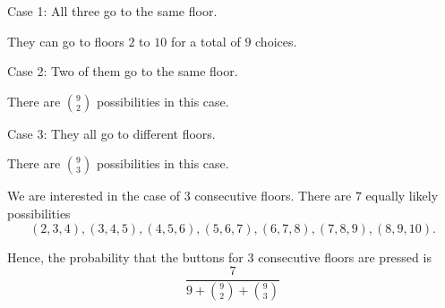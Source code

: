 Case 1: All three go to the same floor.

They can go to floors $2$ to $10$ for a total of $9$ choices.

Case 2: Two of them go to the same floor.

There are $9 \choose 2$ possibilities in this case.

Case 3: They all go to different floors.

There are $9 \choose 3$ possibilities in this case.

We are interested in the case of $3$ consecutive floors. There are $7$ equally 
likely possibilities $$(2, 3, 4), (3, 4, 5), (4, 5, 6), (5, 6, 7), 
(6, 7, 8), (7, 8, 9), (8, 9, 10).$$

Hence, the probability that the buttons for $3$ consecutive floors are 
pressed is $$\frac{7}{9 + {9 \choose 2} + {9 \choose 3}}$$